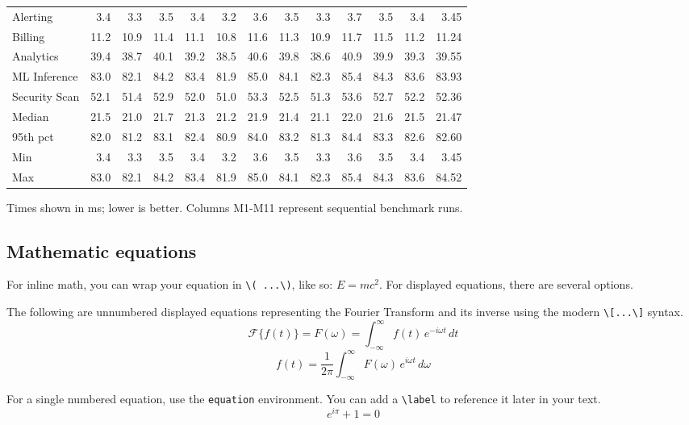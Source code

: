 \begin{table}
{\begin{tabular}{lrrrrrrrrrrrr}
        Alerting      & 3.4  & 3.3  & 3.5  & 3.4  & 3.2  & 3.6  & 3.5  & 3.3  & 3.7  & 3.5  & 3.4  & 3.45  \\
        Billing       & 11.2 & 10.9 & 11.4 & 11.1 & 10.8 & 11.6 & 11.3 & 10.9 & 11.7 & 11.5 & 11.2 & 11.24 \\
        Analytics     & 39.4 & 38.7 & 40.1 & 39.2 & 38.5 & 40.6 & 39.8 & 38.6 & 40.9 & 39.9 & 39.3 & 39.55 \\
        ML Inference  & 83.0 & 82.1 & 84.2 & 83.4 & 81.9 & 85.0 & 84.1 & 82.3 & 85.4 & 84.3 & 83.6 & 83.93 \\
        Security Scan & 52.1 & 51.4 & 52.9 & 52.0 & 51.0 & 53.3 & 52.5 & 51.3 & 53.6 & 52.7 & 52.2 & 52.36 \\
        \midrule
        Median        & 21.5 & 21.0 & 21.7 & 21.3 & 21.2 & 21.9 & 21.4 & 21.1 & 22.0 & 21.6 & 21.5 & 21.47 \\
        95th pct      & 82.0 & 81.2 & 83.1 & 82.4 & 80.9 & 84.0 & 83.2 & 81.3 & 84.4 & 83.3 & 82.6 & 82.60 \\
        Min           & 3.4  & 3.3  & 3.5  & 3.4  & 3.2  & 3.6  & 3.5  & 3.3  & 3.6  & 3.5  & 3.4  & 3.45  \\
        Max           & 83.0 & 82.1 & 84.2 & 83.4 & 81.9 & 85.0 & 84.1 & 82.3 & 85.4 & 84.3 & 83.6 & 84.52 \\
        \bottomrule
    \end{tabular}%
    }
    \vspace{10pt}

    \footnotesize Times shown in ms; lower is better. Columns M1-M11 represent sequential benchmark runs.
\end{table}
\subsection{Mathematic equations}
For inline math, you can wrap your equation in \texttt{\textbackslash( ...\textbackslash)}, like so: \(E=mc^2\). For displayed equations, there are several options.

The following are unnumbered displayed equations representing the Fourier Transform and its inverse using the modern \texttt{\textbackslash[...\textbackslash]} syntax.
\[
\mathcal{F}\{f(t)\}=F(\omega)=\int_{-\infty}^{\infty} f(t)\,e^{-i\omega t}\,dt
\]
\[
f(t)=\frac{1}{2\pi}\int_{-\infty}^{\infty} F(\omega)\,e^{i\omega t}\,d\omega
\]

For a single numbered equation, use the \texttt{equation} environment. You can add a \texttt{\textbackslash label} to reference it later in your text.
\begin{equation}
    \label{eq:euler}
    e^{i\pi} + 1 = 0
\end{equation}

